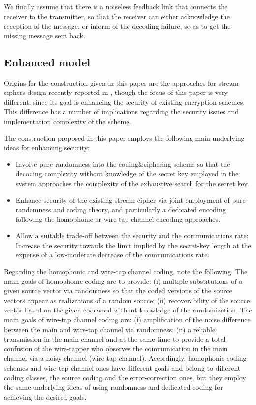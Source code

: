 \documentclass{article}[11pt]
\begin{document}
We finally assume that there is a noiseless feedback link that connects the
receiver to the transmitter, so that the receiver can either acknowledge the
reception of the message, or inform of the decoding failure, so as to get
the missing message sent back.


\subsection{Enhanced model}

Origins for the construction given in this paper are the
approaches for stream ciphers design recently reported in
\cite{mihaljevic-Computimg2009,mihaljevic-IOSpress2009}, though
the focus of this paper is very different, since its goal is
enhancing the security of existing encryption schemes.
This difference has a number of implications regarding the
security issues and implementation complexity of the scheme.

The construction proposed in this paper employs the following main
underlying ideas for enhancing security:

\begin{itemize}

\item Involve pure randomness into the coding\&ciphering scheme
so that the decoding complexity without knowledge of the secret
key employed in the system approaches the complexity of the
exhaustive search for the secret key.

\item  Enhance security of the existing stream cipher via joint
employment of pure randomness and coding theory, and particularly
a dedicated encoding following the homophonic or wire-tap channel
encoding approaches.

\item Allow a suitable trade-off between the security and the
communications rate: Increase the security towards the limit
implied by the secret-key length at the expense of a low-moderate
decrease of the communications rate.

\end{itemize}

Regarding the homophonic and wire-tap channel coding, note the
following. The main goals of homophonic coding are to provide:
(i) multiple substitutions of a given source vector via
randomness so that the coded versions of the source vectors appear
as realizations of a random source; (ii) recoverability of the
source vector based on the given codeword without knowledge of the
randomization. The main goals of wire-tap channel coding are:
(i) amplification of the noise difference between the main and
wire-tap channel via randomness; (ii) a reliable
transmission in the main channel and at the same time to provide a
total confusion of the wire-tapper who observes the communication
in the main channel via a noisy channel (wire-tap channel).
Accordingly, homophonic coding schemes and wire-tap channel ones
have different goals and belong to different coding classes,
the source coding and the error-correction ones, but they employ
the same underlying ideas of using randomness and dedicated
coding for achieving the desired goals.
\end{document}
